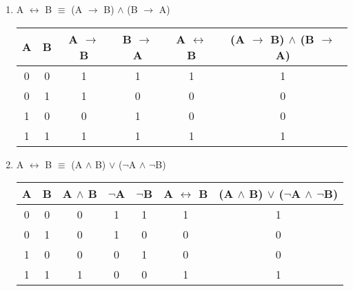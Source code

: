 \documentclass[12pt]{article}
\begin{document}
\begin{enumerate}



  \item A $\leftrightarrow$ B $\equiv$ (A $\to$ B) $\land$ (B $\to$ A)



\begin{center}

  \begin{tabular} {| c | c | c | c | c | c |}

    \hline

    A & B & A $\to$ B & B $\to$ A & A $\leftrightarrow$ B & (A $\to$ B) $\land$ (B $\to$ A) \\ \hline

    0 & 0 & 1 & 1 & 1 & 1 \\

    0 & 1 & 1 & 0 & 0 & 0 \\

    1 & 0 & 0 & 1 & 0 & 0 \\

    1 & 1 & 1 & 1 & 1 & 1 \\ \hline

  \end{tabular} 

\end{center}



  \item A $\leftrightarrow$ B $\equiv$ (A $\land$ B) $\lor$ ($\neg$A $\land$ $\neg$B)



\begin{center}

  \begin{tabular} {| c | c | c | c | c | c | c |}

    \hline

    A & B & A $\land$ B & $\neg$A & $\neg$B & A $\leftrightarrow$ B & (A $\land$ B) $\lor$ ($\neg$A $\land$ $\neg$B) \\ \hline

    0 & 0 & 0 & 1 & 1 & 1 & 1 \\

    0 & 1 & 0 & 1 & 0 & 0 & 0 \\

    1 & 0 & 0 & 0 & 1 & 0 & 0 \\

    1 & 1 & 1 & 0 & 0 & 1 & 1 \\ \hline

  \end{tabular} 

\end{center}



\end{enumerate}
\end{document}
